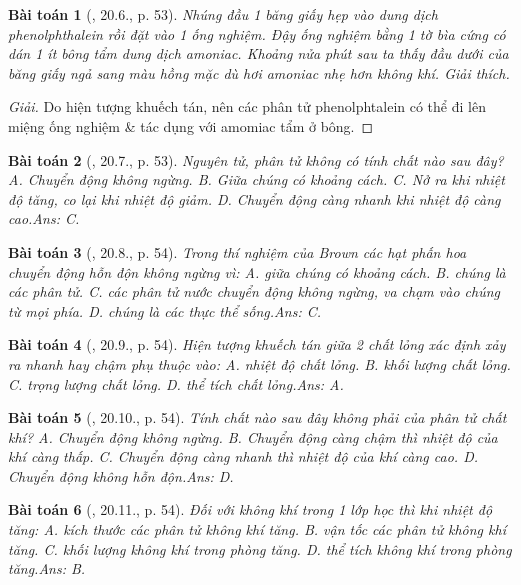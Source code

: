 \documentclass{article}
\newtheorem{baitoan}{Bài toán}
\begin{document}
\begin{baitoan}[\cite{SBT_Vat_Ly_8}, 20.6., p. 53]
	Nhúng đầu 1 băng giấy hẹp vào dung dịch phenolphthalein rồi đặt vào 1 ống nghiệm. Đậy ống nghiệm bằng 1 tờ bìa cứng có dán 1 ít bông tẩm dung dịch amoniac. Khoảng nửa phút sau ta thấy đầu dưới của băng giấy ngả sang màu hồng mặc dù hơi amoniac nhẹ hơn không khí. Giải thích.
\end{baitoan}

\begin{proof}[Giải]
	Do hiện tượng khuếch tán, nên các phân tử phenolphtalein có thể đi lên miệng ống nghiệm \& tác dụng với amomiac  tẩm ở bông.
\end{proof}

\begin{baitoan}[\cite{SBT_Vat_Ly_8}, 20.7., p. 53]
	Nguyên tử, phân tử không có tính chất nào sau đây? {\sf A.} Chuyển động không ngừng. {\sf B.} Giữa chúng có khoảng cách. {\sf C.} Nở ra khi nhiệt độ tăng, co lại khi nhiệt độ giảm. {\sf D.} Chuyển động càng nhanh khi nhiệt độ càng cao.\hfill{\sf Ans: C.}
\end{baitoan}

\begin{baitoan}[\cite{SBT_Vat_Ly_8}, 20.8., p. 54]
	Trong thí nghiệm của Brown các hạt phấn hoa chuyển động hỗn độn không ngừng vì: {\sf A.} giữa chúng có khoảng cách. {\sf B.} chúng là các phân tử. {\sf C.} các phân tử nước chuyển động không ngừng, va chạm vào chúng từ mọi phía. {\sf D.} chúng là các thực thể sống.\hfill{\sf Ans: C.}
\end{baitoan}

\begin{baitoan}[\cite{SBT_Vat_Ly_8}, 20.9., p. 54]
	Hiện tượng khuếch tán giữa 2 chất lỏng xác định xảy ra nhanh hay chậm phụ thuộc vào: {\sf A.} nhiệt độ chất lỏng. {\sf B.} khối lượng chất lỏng. {\sf C.} trọng lượng chất lỏng. {\sf D.} thể  tích chất lỏng.\hfill{\sf Ans: A.}
\end{baitoan}

\begin{baitoan}[\cite{SBT_Vat_Ly_8}, 20.10., p. 54]
	Tính chất nào sau đây không phải của phân tử chất khí? {\sf A.} Chuyển động không ngừng. {\sf B.} Chuyển động càng chậm thì nhiệt độ của khí càng thấp. {\sf C.} Chuyển động càng nhanh thì nhiệt độ của khí càng cao. {\sf D.} Chuyển động không hỗn độn.\hfill{\sf Ans: D.}
\end{baitoan}

\begin{baitoan}[\cite{SBT_Vat_Ly_8}, 20.11., p. 54]
	Đối với không khí trong 1 lớp học thì khi nhiệt độ tăng: {\sf A.} kích thước các phân tử không khí tăng. {\sf B.} vận tốc các phân tử không khí tăng. {\sf C.} khối lượng không khí trong phòng tăng. {\sf D.} thể tích không khí trong phòng tăng.\hfill{\sf Ans: B.}
\end{baitoan}
\end{document}
